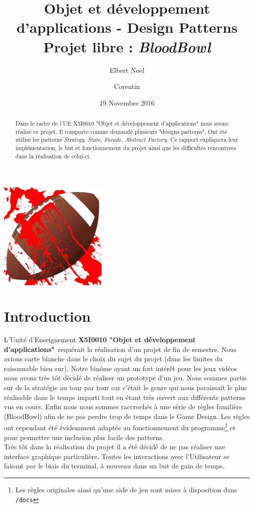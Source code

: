\documentclass{article}
\title{Objet et développement d'applications - Design Patterns\\
Projet libre : \emph{BloodBowl}}
\author{Elbert Noel \bsc{Nyunting} \and Corentin \bsc{Chédotal}}
\date{19 Novembre 2016}
\newcommand{\info}{\texttt}
\newcommand{\pattern}{\emph}
\newcommand{\ue}{\textbf{X5I0010 "Objet et développement d'applications"}}
\begin{document}
\maketitle

\vspace{1cm}
\centerline{\includegraphics[scale=0.75]{img/logo.png}}
\vspace{1cm}

\begin{abstract}
    Dans le cadre de l'UE X5I0010 "Objet et développement d'applications" nous avons réalisé ce projet. Il comporte comme demandé plusieurs "designs patterns". Ont été utilisé les patterns \pattern{Strategy}, \pattern{State}, \pattern{Facade}, \pattern{Abstract Factory}. Ce rapport expliquera leur implémentation, le but et fonctionnement du projet ainsi que les difficultés rencontrées dans la réalisation de celui-ci.
\end{abstract}

\newpage

\tableofcontents

\newpage

\section{Introduction}
    
    L'Unité d'Enseignement \ue\ requérait la réalisation d'un projet de fin de semestre. Nous avions carte blanche dans le choix du sujet du projet (dans les limites du raisonnable bien sur). Notre binôme ayant un fort intérêt pour les jeux vidéos nous avons très tôt décidé de réaliser un prototype d'un jeu. Nous sommes partis sur de la stratégie au tour par tour car c'était le genre qui nous paraissait le plus réalisable dans le temps imparti tout en étant très ouvert aux différents patterns vus en cours. Enfin nous nous sommes raccrochés à une série de règles familière (BloodBowl) afin de ne pas perdre trop de temps dans le Game Design. Les règles ont cependant été évidemment adaptée au fonctionnement du programme\footnote{Les règles originales ainsi qu'une aide de jeu sont mises à disposition dans \info{/docs}} et pour permettre une inclusion plus facile des patterns.\\
    Très tôt dans la réalisation du projet il a été décidé de ne pas réaliser une interface graphique particulière. Toutes les interactions avec l'Utilisateur se faisant par le biais du terminal, à nouveau dans un but de gain de temps.
\end{document}
